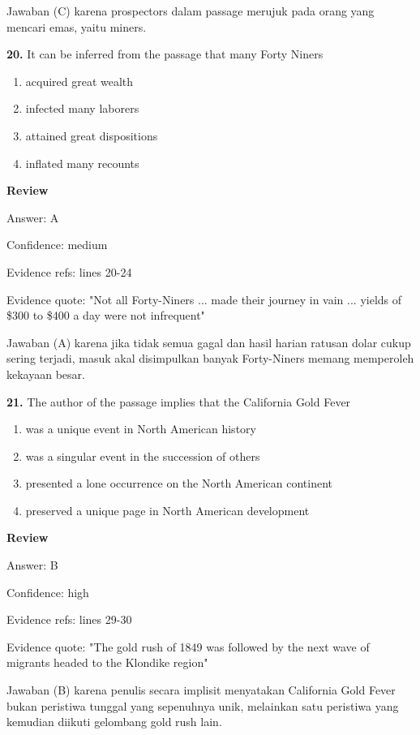 \documentclass[12pt]{article}
\begin{document}
Jawaban (C) karena prospectors dalam passage merujuk pada orang yang mencari emas, yaitu miners.\par
\endgroup
\par
\vspace{0.25\baselineskip}
\noindent\textbf{20.} It can be inferred from the passage that many Forty Niners
\begin{enumerate}[label=(\Alph*),leftmargin=*,itemsep=0.2em]
\item acquired great wealth
\item infected many laborers
\item attained great dispositions
\item inflated many recounts
\end{enumerate}
\par
\begingroup
\setlength{\parskip}{0pt}
\setlength{\parindent}{0pt}
\textbf{Review}\par
Answer: A\par
Confidence: medium\par
Evidence refs: lines 20-24\par
Evidence quote: "Not all Forty-Niners ... made their journey in vain ... yields of \$300 to \$400 a day were not infrequent"\par
Jawaban (A) karena jika tidak semua gagal dan hasil harian ratusan dolar cukup sering terjadi, masuk akal disimpulkan banyak Forty-Niners memang memperoleh kekayaan besar.\par
\endgroup
\par
\vspace{0.25\baselineskip}
\noindent\textbf{21.} The author of the passage implies that the California Gold Fever
\begin{enumerate}[label=(\Alph*),leftmargin=*,itemsep=0.2em]
\item was a unique event in North American history
\item was a singular event in the succession of others
\item presented a lone occurrence on the North American continent
\item preserved a unique page in North American development
\end{enumerate}
\par
\begingroup
\setlength{\parskip}{0pt}
\setlength{\parindent}{0pt}
\textbf{Review}\par
Answer: B\par
Confidence: high\par
Evidence refs: lines 29-30\par
Evidence quote: "The gold rush of 1849 was followed by the next wave of migrants headed to the Klondike region"\par
Jawaban (B) karena penulis secara implisit menyatakan California Gold Fever bukan peristiwa tunggal yang sepenuhnya unik, melainkan satu peristiwa yang kemudian diikuti gelombang gold rush lain.\par
\endgroup
\par
\vspace{0.25\baselineskip}
\end{document}
